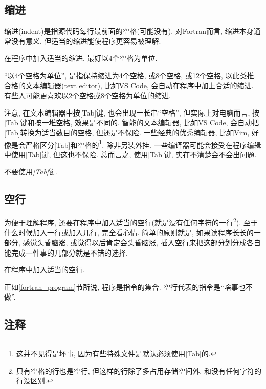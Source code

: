\subsection{缩进}

缩进(indent)是指源代码每行最前面的空格(可能没有). 对Fortran而言, 缩进本身通常没有意义, 但适当的缩进能使程序更容易被理解.

\begin{convention}\label{fortran_indent}
    在程序中加入适当的缩进, 最好以$4$个空格为单位.
\end{convention}

``以4个空格为单位'', 是指保持缩进为4个空格, 或8个空格, 或12个空格, 以此类推. 合格的文本编辑器(text editor), 比如VS Code, 会自动在程序中加上合适的缩进. 有些人可能更喜欢以2个空格或8个空格为单位的缩进.

注意, 在文本编辑器中按[Tab]键, 也会出现一长串``空格'', 但实际上对电脑而言, 按[Tab]键和按一堆空格, 效果是不同的. 智能的文本编辑器, 比如VS Code, 会自动把[Tab]转换为适当数目的空格, 但还是不保险. 一些经典的优秀编辑器, 比如Vim, 好像是会严格区分[Tab]和空格的\footnote{
    这并不见得是坏事, 因为有些特殊文件是默认必须使用[Tab]的.
}, 除非另装外挂. 一些编译器可能会接受在程序编辑中使用[Tab]键, 但这也不保险. 总而言之, 使用[Tab]键, 实在不清楚会不会出问题.

\begin{convention}
    不要使用\emph{[Tab]}键.
\end{convention}

\subsection{空行}

为便于理解程序, 还要在程序中加入适当的空行(就是没有任何字符的一行\footnote{
    只有空格的行也是空行, 但这样的行除了多占用存储空间外, 和没有任何字符的行没区别.
}). 至于什么时候加入一行或加入几行, 完全看心情. 简单的原则就是, 如果读程序长长的一部分, 感觉头昏脑涨, 或觉得以后肯定会头昏脑涨, 插入空行来把这部分划分成各自能完成一件事的几部分就是不错的选择.

\begin{convention}
    在程序中加入适当的空行.
\end{convention}

正如\ref{fortran_program}节所说, 程序是指令的集合. 空行代表的指令是``啥事也不做''.

\subsection{注释}

